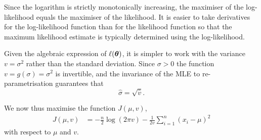 \begin{exenumerate}
  \begin{solution}
    Since the logarithm is strictly monotonically increasing, the
    maximiser of the log-likelihood equals the maximiser of the
    likelihood. It is easier to take derivatives for the
    log-likelihood function than for the likelihood function so that
    the maximum likelihood estimate is typically determined using the log-likelihood.

    Given the algebraic expression of $\ell(\boldsymbol{\theta})$, it is simpler
    to work with the variance $v=\sigma^2$ rather than the standard
    deviation. Since $\sigma > 0$ the function $v = g(\sigma) = \sigma^2$
    is invertible, and the invariance of the MLE to re-parametrisation
    guarantees that
    $$ \hat{\sigma} = \sqrt{\hat{v}}. $$

    We now thus maximise the function $J(\mu, v)$,
    \begin{align}
      J(\mu, v) & = -\frac{n}{2} \log(2\pi v) -\frac{1}{2v} \sum_{i=1}^n (x_i-\mu)^2
    \end{align}
    with respect to $\mu$ and $v$.


\end{solution}
\end{exenumerate}
